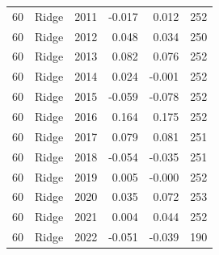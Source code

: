 \begin{table}[htbp]
{\begin{tabular}{llrrrr}
60 & Ridge & 2011 & -0.017 & 0.012 & 252 \\
60 & Ridge & 2012 & 0.048 & 0.034 & 250 \\
60 & Ridge & 2013 & 0.082 & 0.076 & 252 \\
60 & Ridge & 2014 & 0.024 & -0.001 & 252 \\
60 & Ridge & 2015 & -0.059 & -0.078 & 252 \\
60 & Ridge & 2016 & 0.164 & 0.175 & 252 \\
60 & Ridge & 2017 & 0.079 & 0.081 & 251 \\
60 & Ridge & 2018 & -0.054 & -0.035 & 251 \\
60 & Ridge & 2019 & 0.005 & -0.000 & 252 \\
60 & Ridge & 2020 & 0.035 & 0.072 & 253 \\
60 & Ridge & 2021 & 0.004 & 0.044 & 252 \\
60 & Ridge & 2022 & -0.051 & -0.039 & 190 \\
\bottomrule
\end{tabular}}
\end{table}